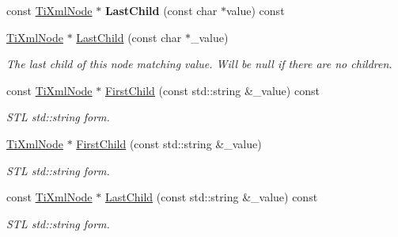\begin{DoxyCompactItemize}
\hypertarget{class_ti_xml_node_afdd7b6ba456fdd570610c1d841f91eb3}{}\label{class_ti_xml_node_afdd7b6ba456fdd570610c1d841f91eb3} 
const \hyperlink{class_ti_xml_node}{Ti\+Xml\+Node} $\ast$ {\bfseries Last\+Child} (const char $\ast$value) const
\item 
\hypertarget{class_ti_xml_node_abad5bf1059c48127b958711ef89e8e5d}{}\label{class_ti_xml_node_abad5bf1059c48127b958711ef89e8e5d} 
\hyperlink{class_ti_xml_node}{Ti\+Xml\+Node} $\ast$ \hyperlink{class_ti_xml_node_abad5bf1059c48127b958711ef89e8e5d}{Last\+Child} (const char $\ast$\+\_\+value)
\begin{DoxyCompactList}\small\item\em The last child of this node matching \textquotesingle{}value\textquotesingle{}. Will be null if there are no children. \end{DoxyCompactList}\item 
\hypertarget{class_ti_xml_node_ab7f52e96c41fca07e81521b5f5ea35b9}{}\label{class_ti_xml_node_ab7f52e96c41fca07e81521b5f5ea35b9} 
const \hyperlink{class_ti_xml_node}{Ti\+Xml\+Node} $\ast$ \hyperlink{class_ti_xml_node_ab7f52e96c41fca07e81521b5f5ea35b9}{First\+Child} (const std\+::string \&\+\_\+value) const
\begin{DoxyCompactList}\small\item\em S\+TL std\+::string form. \end{DoxyCompactList}\item 
\hypertarget{class_ti_xml_node_a10d2669ccb5e29e02fcb0e4408685ef6}{}\label{class_ti_xml_node_a10d2669ccb5e29e02fcb0e4408685ef6} 
\hyperlink{class_ti_xml_node}{Ti\+Xml\+Node} $\ast$ \hyperlink{class_ti_xml_node_a10d2669ccb5e29e02fcb0e4408685ef6}{First\+Child} (const std\+::string \&\+\_\+value)
\begin{DoxyCompactList}\small\item\em S\+TL std\+::string form. \end{DoxyCompactList}\item 
\hypertarget{class_ti_xml_node_a96b721f14d5393dac70a0eff0d08520e}{}\label{class_ti_xml_node_a96b721f14d5393dac70a0eff0d08520e} 
const \hyperlink{class_ti_xml_node}{Ti\+Xml\+Node} $\ast$ \hyperlink{class_ti_xml_node_a96b721f14d5393dac70a0eff0d08520e}{Last\+Child} (const std\+::string \&\+\_\+value) const
\begin{DoxyCompactList}\small\item\em S\+TL std\+::string form. \end{DoxyCompactList}\item 
\hypertarget{class_ti_xml_node_a69772c9202f70553f940b15c06b07be3}{}\label{class_ti_xml_node_a69772c9202f70553f940b15c06b07be3} 

\end{DoxyCompactItemize}
